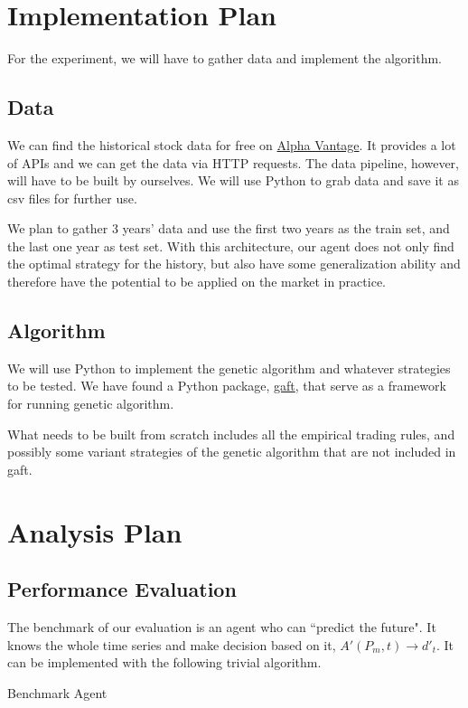\documentclass{article}
\begin{document}
\section{Implementation Plan}

For the experiment, we will have to gather data and implement the algorithm.

\subsection{Data}

We can find the historical stock data for free on \href{https://www.alphavantage.co/}{Alpha Vantage}.
It provides a lot of APIs and we can get the data via HTTP requests.
The data pipeline, however, will have to be built by ourselves.
We will use Python to grab data and save it as csv files for further use.

We plan to gather 3 years' data and use the first two years as the train set,
and the last one year as test set.
With this architecture, our agent does not only find the optimal strategy for the history,
but also have some generalization ability and therefore have the potential to be applied on the market in practice.

\subsection{Algorithm}

We will use Python to implement the genetic algorithm and whatever strategies to be tested.
We have found a Python package, \href{https://github.com/PytLab/gaft}{gaft}, that serve as a framework for running genetic algorithm.

What needs to be built from scratch includes all the empirical trading rules,
and possibly some variant strategies of the genetic algorithm that are not included in gaft.

\section{Analysis Plan}

\subsection{Performance Evaluation}

The benchmark of our evaluation is an agent who can ``predict the future".
It knows the whole time series and make decision based on it,
$A'(P_m, t) \rightarrow d'_t$.
It can be implemented with the following trivial algorithm.
\begin{algorithm}[H]

	\caption{Benchmark Agent}
\end{algorithm}
\end{document}
